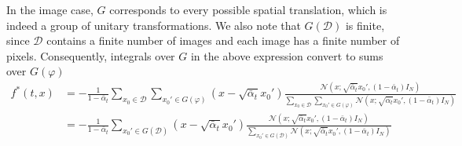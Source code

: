 \documentclass[a4paper,10pt]{article}
\theoremstyle{definition} %
\newtheorem{definition}{Definition}[section]
\theoremstyle{definition} %
\theoremstyle{definition} %
\newtheorem{theorem}[definition]{Theorem}
\theoremstyle{definition} %
\newcommand{\0}{\boldsymbol{0}}
\renewcommand{\det}[1]{\mathrm{det}\left( #1 \right)}
\begin{document}
In the image case, $G$ corresponds to every possible spatial translation, which is indeed a group of unitary transformations. We also note that $G(\mathcal{D})$ is finite, since $\mathcal{D}$ contains a finite number of images and each image has a finite number of pixels. Consequently, integrals over $G$ in the above expression convert to sums over $G(\varphi)$ 
\begin{align*}
        f^*(t,x) &= -\frac{1}{1-\bar \alpha_t} \sum\limits_{x_0  \in \mathcal{D}} \sum\limits_{x_0' \in G(\varphi)} (x - \sqrt{\bar \alpha_t} x_0') \frac{\mathcal{N}(x;\sqrt{\bar \alpha_t} x_0', (1-\bar \alpha_t) I_N) }{\sum\limits_{x_0  \in \mathcal{D}} \sum\limits_{x_0'\in G(\varphi)} \mathcal{N}(x;\sqrt{\bar \alpha_t} x_0', (1-\bar \alpha_t) I_N)}\\
        &= -\frac{1}{1-\bar \alpha_t}  \sum\limits_{x_0' \in G(\mathcal{D})} (x - \sqrt{\bar \alpha_t} x_0') \frac{\mathcal{N}(x;\sqrt{\bar \alpha_t} x_0', (1-\bar \alpha_t) I_N) }{ \sum\limits_{x_0'\in G(\mathcal{D})} \mathcal{N}(x;\sqrt{\bar \alpha_t} x_0', (1-\bar \alpha_t) I_N)}
\end{align*}
\end{document}
